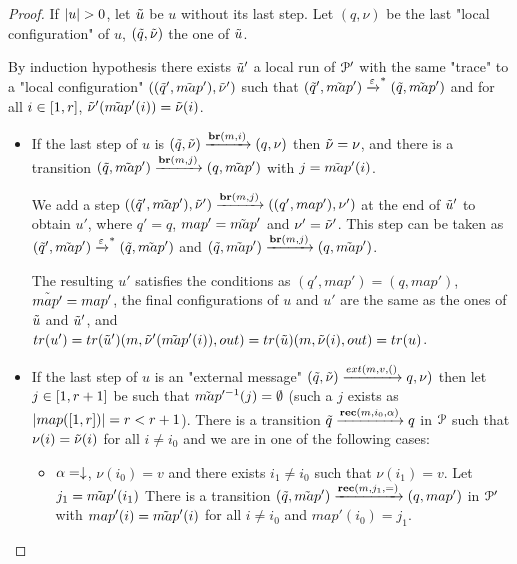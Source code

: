 \begin{proof}
	If $\size{u}>0$, let $\Tilde{u}$ be $u$ without its last step. Let $(q, \nu)$ be the last "local configuration" of $u$, $(\Tilde{q}, \Tilde{\nu})$ the one of $\Tilde{u}$.
	
	By induction hypothesis there exists $\Tilde{u}'$ a local run of $\mathcal{P}'$ with the same "trace" to a "local configuration" $((\Tilde{q}', \Tilde{map}'), \Tilde{\nu}')$ such that $(\Tilde{q}', \Tilde{map}') \xrightarrow{\varepsilon}^* (\Tilde{q}, \Tilde{map}')$ and for all $i \in [1,r]$, $\Tilde{\nu}'(\Tilde{map}'(i)) = \Tilde{\nu}(i)$.
	
	\begin{itemize}
		\item 
		If the last step of $u$ is $(\Tilde{q}, \Tilde{\nu}) \xrightarrow{\textbf{br}(m, i)} (q, \nu)$ then $\Tilde{\nu} = \nu$, and there is a transition $(\Tilde{q}, \Tilde{map}') \xrightarrow{\textbf{br}(m, j)} (q, \Tilde{map}')$ with $j=\Tilde{map}'(i)$.
		
		We add a step $((\Tilde{q}', \Tilde{map}'), \Tilde{\nu}') \xrightarrow{\textbf{br}(m, j)} ((q', map'), \nu')$ at the end of $\Tilde{u}'$ to obtain $u'$, where $q' = q$, $map' = \Tilde{map}'$ and $\nu' = \Tilde{\nu}'$. 
		This step can be taken as $(\Tilde{q}', \Tilde{map}') \xrightarrow{\varepsilon}^* (\Tilde{q}, \Tilde{map}')$ and $(\Tilde{q}, \Tilde{map}') \xrightarrow{\textbf{br}(m, j)} (q, \Tilde{map}')$.   
		
		The resulting $u'$ satisfies the conditions as $(q', map') = (q, map')$, $\Tilde{map'} = map'$, the final configurations of $u$ and $u'$ are the same as the ones of $\Tilde{u}$ and $\Tilde{u}'$, and $\trace{u'} = \trace{\Tilde{u}'} (m,\Tilde{\nu}'(\Tilde{map}'(i)),out) = \trace{\Tilde{u}} (m,\Tilde{\nu}(i),out) = \trace{u}$.
		
		\item 
		If the last step of $u$ is an "external message" $(\Tilde{q}, \Tilde{\nu}) \extbr{m, v} (q, \nu)$ then let $j\in [1,r+1]$ be such that $\Tilde{map}'^{-1}(j) = \emptyset$ (such a $j$ exists as $|map([1,r])| = r < r+1$). There is a transition $\Tilde{q} \xrightarrow{\textbf{rec}(m, i_0, \alpha)} q$ in $\mathcal{P}$ such that $\nu(i)=\Tilde{\nu}(i)$ for all $i\neq i_0$ and we are in one of the following cases:
		
		\begin{itemize}
			\item $\alpha=\downarrow$, $\nu(i_0) = v$ and there exists $i_1 \neq i_0$ such that $\nu(i_1) = v$. Let $j_1=\Tilde{map}'(i_1)$
			There is a transition $(\Tilde{q}, \Tilde{map}') \xrightarrow{\textbf{rec}(m, j_1, {=})} (q, map')$ in $\mathcal{P}'$ with $map'(i) = \Tilde{map}'(i)$ for all $i\neq i_0$ and $map'(i_0) = j_1$.
			

\end{itemize}
\end{itemize}
\end{proof}
